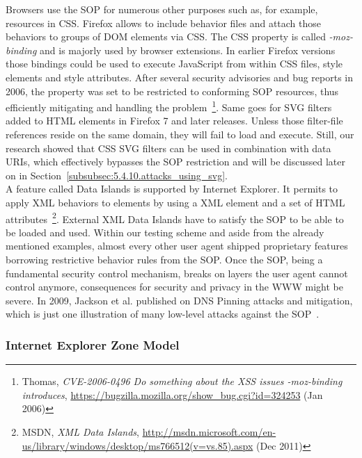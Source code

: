 	Browsers use the SOP for numerous other purposes such as, for example, resources in CSS. Firefox allows to include behavior files and attach those behaviors to groups of DOM elements via CSS. The CSS property is called \textit{-moz-binding} and is majorly used by browser extensions. In earlier Firefox versions those bindings could be used to execute JavaScript from within CSS files, style elements and style attributes. After several security advisories and bug reports in 2006, the property was set to be restricted to conforming SOP resources, thus efficiently mitigating and handling the problem~\footnote{Thomas, \textit{CVE-2006-0496 Do something about the XSS issues -moz-binding introduces}, \url{https://bugzilla.mozilla.org/show_bug.cgi?id=324253} (Jan 2006)}. Same goes for SVG filters added to HTML elements in Firefox 7 and later releases. Unless those filter-file references reside on the same domain, they will fail to load and execute. Still, our research showed that CSS SVG filters can be used in 
combination with data URIs, which effectively bypasses the SOP restriction and will be discussed later on in Section~\ref{subsubsec:5.4.10.attacks_using_svg}.\\

	A feature called Data Islands is supported by Internet Explorer. It permits to apply XML behaviors to elements by using a XML element and a set of HTML attributes~\footnote{MSDN, \textit{XML Data Islands}, \url{http://msdn.microsoft.com/en-us/library/windows/desktop/ms766512(v=vs.85).aspx} (Dec 2011)}. External XML Data Islands have to satisfy the SOP to be able to be loaded and used. Within our testing scheme and aside from the already mentioned examples, almost every other user agent shipped proprietary features borrowing restrictive behavior rules from the SOP. Once the SOP, being a fundamental security control mechanism, breaks on layers the user agent cannot control anymore, consequences for security and privacy in the WWW might be severe. In 2009, Jackson et al. published on DNS Pinning attacks and mitigation, which is just one illustration of many low-level attacks against the SOP~\cite{jackson2009protecting}.
      

      \subsubsection{Internet Explorer Zone Model}
      \label{subsubsubsec:2.4.1.2.internet_explorer_zone_model}

